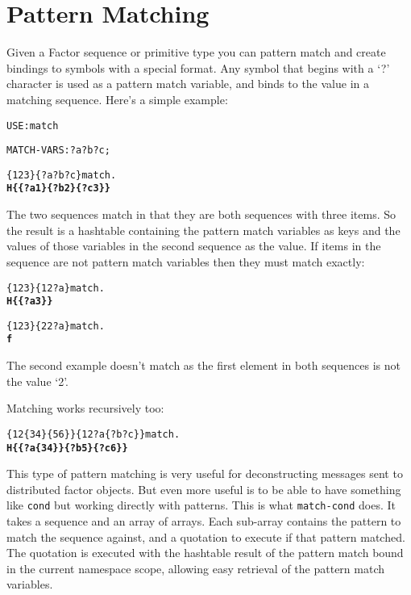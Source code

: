 \chapter{Pattern Matching}\label{patternmatching}

Given a Factor sequence or primitive type you can pattern match and
create bindings to symbols with a special format. Any symbol that
begins with a `?' character is used as a pattern match variable, and
binds to the value in a matching sequence. Here's a simple example:


\begin{alltt}
USE: match

MATCH-VARS: ?a ?b ?c ;

\{ 1 2 3 \} \{ ?a ?b ?c \} match . 
  \textbf{H\{ \{ ?a 1 \} \{ ?b 2 \} \{ ?c 3 \} \}}
\end{alltt}

The two sequences match in that they are both sequences with three
items. So the result is a hashtable containing the pattern match
variables as keys and the values of those variables in the second
sequence as the value. If items in the sequence are not pattern match
variables then they must match exactly:

\begin{alltt}
\{ 1 2 3 \} \{ 1 2 ?a \} match .
  \textbf{H\{ \{ ?a 3 \} \}}

\{ 1 2 3 \} \{ 2 2 ?a \} match .
  \textbf{f}
\end{alltt}


The second example doesn't match as the first element in both
sequences is not the value `2'.

Matching works recursively too:

\begin{alltt}
\{ 1 2 \{ 3 4 \} \{ 5 6 \} \} \{ 1 2 ?a \{ ?b ?c \} \} match .
  \textbf{H\{ \{ ?a \{ 3 4 \} \} \{ ?b 5 \} \{ ?c 6 \} \}}
\end{alltt}


This type of pattern matching is very useful for deconstructing
messages sent to distributed factor objects. But even more useful is
to be able to have something like \verb|cond| but working directly with
patterns. This is what \verb|match-cond| does. It takes a sequence and an
array of arrays. Each sub-array contains the pattern to match the
sequence against, and a quotation to execute if that pattern
matched. The quotation is executed with the hashtable result of the
pattern match bound in the current namespace scope, allowing easy
retrieval of the pattern match variables.

